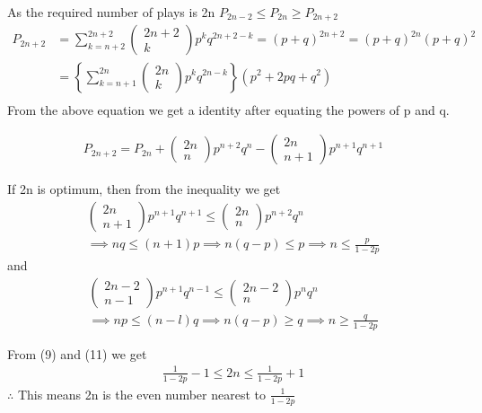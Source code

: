 \documentclass{beamer}
\begin{document}
\begin{frame}
As the required number of plays is 2n 
 $P_{2n-2}\leq P_{2n}\geq P_{2n+2}$
\begin{align}
P_{2n+2} &= \sum_{k=n+2}^{2n+2} \begin{pmatrix} 2n+2\\k\end{pmatrix} p^{k}q^{2n+2-k} = (p+q)^{2n+2} = (p+q)^{2n}(p+q)^{2}  \\
&= \left\lbrace\sum_{k=n+1}^{2n} \begin{pmatrix} 2n\\k\end{pmatrix} p^{k}q^{2n-k}\right\rbrace (p^{2}+ 2pq + q^{2}) \\
\end{align}
From the above equation we get a identity after equating the powers of p and q.

\begin{align}
P_{2n+2} = P_{2n} + \begin{pmatrix} 2n\\n\end{pmatrix} p^{n+2}q^{n} - \begin{pmatrix} 2n\\n+1\end{pmatrix} p^{n+1}q^{n+1}
\end{align}
\end{frame}

\begin{frame}
If 2n is optimum, then from the inequality we get
\begin{align}
\begin{pmatrix} 2n\\n+1\end{pmatrix} p^{n+1}q^{n+1} \leq \begin{pmatrix} 2n\\n\end{pmatrix} p^{n+2}q^{n} \\
\implies nq \leq (n + 1)p \implies n(q-p) \leq p \implies  n \leq \frac{p}{1-2p}
\end{align}
and
\begin{align}
\begin{pmatrix} 2n-2\\n-1\end{pmatrix} p^{n+1}q^{n-1} \leq \begin{pmatrix} 2n-2\\n\end{pmatrix} p^{n}q^{n} \\
\implies np \leq (n - l)q \implies n(q-p) \geq q \implies  n \geq \frac{q}{1-2p}
\end{align}
\end{frame}

\begin{frame}
From (9) and (11) we get 
\begin{align}
\frac{1}{1-2p} - 1 \leq 2n \leq \frac{1}{1-2p} + 1
\end{align}
$\therefore$ This means 2n is the even number nearest to $\frac{1}{1-2p}$
\end{frame}
\end{document}
